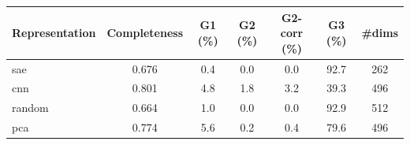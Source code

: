 \begin{tabular}{lcccccc}
\toprule
Representation & Completeness & G1 (\%) & G2 (\%) & G2-corr (\%) & G3 (\%) & \#dims \\
\midrule
sae & 0.676 & 0.4 & 0.0 & 0.0 & 92.7 & 262 \\
cnn & 0.801 & 4.8 & 1.8 & 3.2 & 39.3 & 496 \\
random & 0.664 & 1.0 & 0.0 & 0.0 & 92.9 & 512 \\
pca & 0.774 & 5.6 & 0.2 & 0.4 & 79.6 & 496 \\
\bottomrule
\end{tabular}